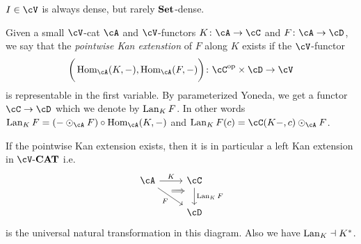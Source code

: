 \documentclass[a4paper,11pt,oneside,openany]{scrbook}
\begin{document}
\begin{exmp}
	$ I \in \cV $ is always dense, but rarely $ {\normalfont\textbf{Set}} $-dense.
\end{exmp}
\begin{defn}
	Given a small $ \cV $-cat $ \cA $ and $ \cV $-functors $ K\from \cA \to \cC $ and $ F \from \cA \to \cD$, we say that the \emph{pointwise Kan extenstion} of $ F $ along $ K $ exists if the $ \cV $-functor
	\begin{displaymath}
		[\cA^{\op}, \cV]\bigg(\Hom_{\cA} (K,-) ,\Hom_{\cA}(F,-)\bigg) \from \cC^{\op} \times  \cD \to \cV
	\end{displaymath}
	is representable in the first variable.
	By parameterized Yoneda, we get a functor $ \cC \to \cD $ which we denote by $ \operatorname{Lan}_K F $. In other words $ \Lan_K F = (- \odot_\cA F) \circ \Hom_\cA(K,-) $ and $ \Lan_K F(c) = \cC(K-,c)\odot _\cA F $.
\end{defn}
\begin{prop}
	If the pointwise Kan extension exists, then it is in particular a left Kan extension in $ \cV \text{-} \CAT $ i.e.
	\begin{displaymath}
		\begin{tikzcd}
			\cA \arrow[r, "K"]\arrow[rd,"F"', 	""{name=F,marking,near start}] 	 &
			\cC \arrow[d, "{\Lan_K F}",		""{name=L,marking,above, near start}]	\\
			& \cD
			\arrow[Rightarrow, from=F, to=L, shorten <=10pt, shorten >=10pt, start anchor={north west}, end anchor={[yshift=1pt]}]
		\end{tikzcd}
	\end{displaymath}
	is the universal natural transformation in this diagram.
	Also we have $ \operatorname{Lan}_K \dashv K^* $.
\end{prop}
\end{document}
